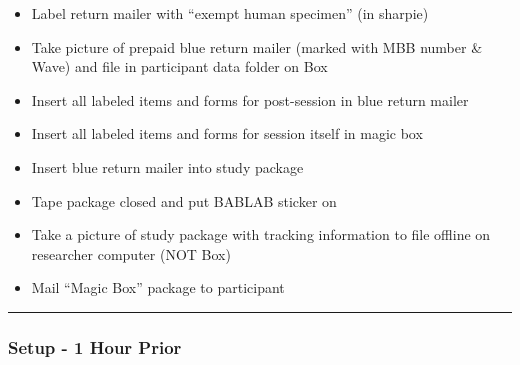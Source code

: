 \documentclass[
]{book}
\begin{document}
\begin{itemize}
\item
  Label return mailer with ``exempt human specimen'' (in sharpie)
\item
  Take picture of prepaid blue return mailer (marked with MBB number \& Wave) and file in participant data folder on Box
\item
  Insert all labeled items and forms for post-session in blue return mailer
\item
  Insert all labeled items and forms for session itself in magic box
\item
  Insert blue return mailer into study package
\item
  Tape package closed and put BABLAB sticker on
\item
  Take a picture of study package with tracking information to file offline on researcher computer (NOT Box)
\item
  Mail ``Magic Box'' package to participant
\end{itemize}

\begin{center}\rule{0.5\linewidth}{0.5pt}\end{center}

\hypertarget{setup---1-hour-prior}{%
\subsubsection{Setup - 1 Hour Prior}\label{setup---1-hour-prior}}
\end{document}

